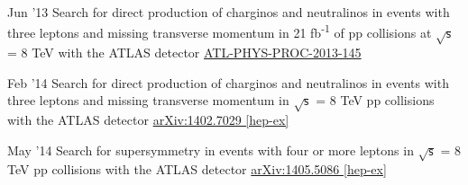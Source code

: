 \documentclass[]{cv} %
\begin{document}
\begin{entrylist}
  \entry
  {Jun '13}
  {{\normalfont Search for direct production of charginos and neutralinos in events with three leptons and missing transverse momentum in 21
    fb\textsuperscript{-1} of pp collisions at $\sqrt{\mathsf{s}}$ = 8 TeV with the ATLAS detector}}
  {\href{https://cds.cern.ch/record/1554811}{ATL-PHYS-PROC-2013-145}}
  {\vspace*{\spacingPubs}}

  \entry
  {Feb '14}
  {{\normalfont Search for direct production of charginos and neutralinos in events with three leptons and missing transverse momentum in $\sqrt{\mathsf{s}}$ =
  8 TeV pp collisions with the ATLAS detector}}
  {\href{http://arxiv.org/abs/1402.7029}{arXiv:1402.7029 [hep-ex]}}
  {\vspace*{\spacingPubs}}

  \entry
  {May '14}
  {{\normalfont Search for supersymmetry in events with four or more leptons in $\sqrt{\mathsf{s}}$ = 8 TeV pp collisions with the ATLAS detector}}
  {\href{http://arxiv.org/abs/1405.5086}{arXiv:1405.5086 [hep-ex]}}
  {\vspace*{\spacingPubs}}

\end{entrylist}

\ifinternalNotes
\end{document}
